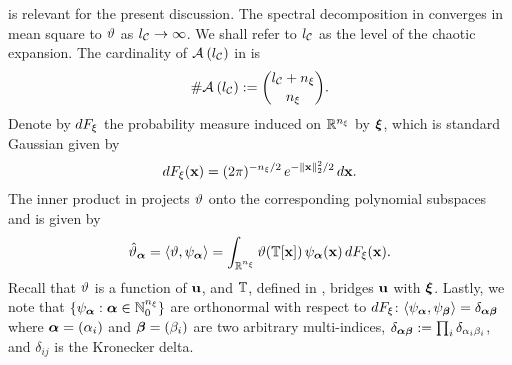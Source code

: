  is relevant for the present discussion.
The spectral decomposition in  converges in mean square to $\w$ as $\nclevel \to \infty$.
We shall refer to $\nclevel$ as the level of the chaotic expansion.
The cardinality of $\chaosMultiindexSet{\nclevel}$ in  is
\[
  \cardinality{\chaosMultiindexSet{\nclevel}} := { \nclevel + \nvars \choose \nvars }.
\]
Denote by $\d\distribution_\z$ the probability measure induced on $\real^\nvars$ by $\vz$, which is standard Gaussian given by
\begin{equation} \xelab{standard-gaussian-measure}
  \d\distribution_\z(\point) = (2 \pi)^{-\nvars/2} \, e^{-\norm[2]{\point}^2 / 2} \, \d\point.
\end{equation}
The inner product in  projects $\w$ onto the corresponding polynomial subspaces and is given by
\begin{equation} \xelab{orthogonal-projection}
  \coefficient{\w}_{\multiindex} = \innerProduct{\w, \polynomial_{\multiindex}} = \int_{\real^{\nvars}} \w(\transformation[\point]) \, \polynomial_{\multiindex}(\point) \, \d\distribution_\z(\point).
\end{equation}
Recall that $\w$ is a function of $\vu$, and $\transformation$, defined in , bridges $\vu$ with $\vz$.
Lastly, we note that $\{ \polynomial_{\multiindex}: \multiindex \in \natural^\nvars \}$ are orthonormal with respect to $\d\distribution_\z$: $\innerProduct{\polynomial_{\multiindex}, \polynomial_{\multiindex[\beta]}} = \delta_{\multiindex \multiindex[\beta]}$ where $\multiindex = (\alpha_i)$ and $\multiindex[\beta] = (\beta_i)$ are two arbitrary multi-indices, $\delta_{\multiindex \multiindex[\beta]} := \prod_i \delta_{\alpha_i \beta_i}$, and $\delta_{ij}$ is the Kronecker delta.
